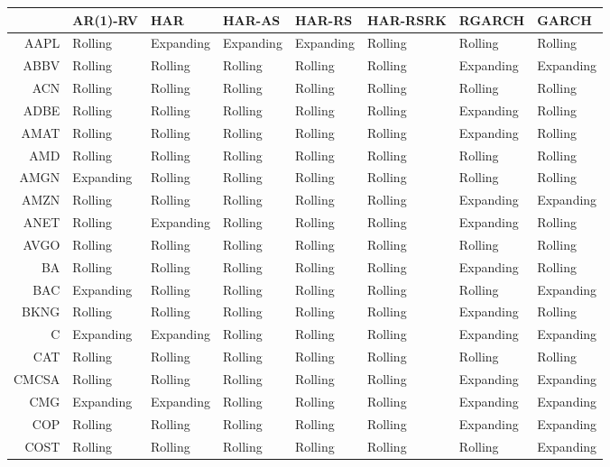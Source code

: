 \begin{table}[ht]
\centering
\begin{tabular}{rlllllll}
  \hline
 & AR(1)-RV & HAR & HAR-AS & HAR-RS & HAR-RSRK & RGARCH & GARCH \\ 
  \hline
AAPL & Rolling & Expanding & Expanding & Expanding & Rolling & Rolling & Rolling \\ 
  ABBV & Rolling & Rolling & Rolling & Rolling & Rolling & Expanding & Expanding \\ 
  ACN & Rolling & Rolling & Rolling & Rolling & Rolling & Rolling & Rolling \\ 
  ADBE & Rolling & Rolling & Rolling & Rolling & Rolling & Expanding & Rolling \\ 
  AMAT & Rolling & Rolling & Rolling & Rolling & Rolling & Expanding & Rolling \\ 
  AMD & Rolling & Rolling & Rolling & Rolling & Rolling & Rolling & Rolling \\ 
  AMGN & Expanding & Rolling & Rolling & Rolling & Rolling & Rolling & Rolling \\ 
  AMZN & Rolling & Rolling & Rolling & Rolling & Rolling & Expanding & Expanding \\ 
  ANET & Rolling & Expanding & Rolling & Rolling & Rolling & Expanding & Rolling \\ 
  AVGO & Rolling & Rolling & Rolling & Rolling & Rolling & Rolling & Rolling \\ 
  BA & Rolling & Rolling & Rolling & Rolling & Rolling & Expanding & Rolling \\ 
  BAC & Expanding & Rolling & Rolling & Rolling & Rolling & Rolling & Expanding \\ 
  BKNG & Rolling & Rolling & Rolling & Rolling & Rolling & Expanding & Rolling \\ 
  C & Expanding & Expanding & Rolling & Rolling & Rolling & Expanding & Expanding \\ 
  CAT & Rolling & Rolling & Rolling & Rolling & Rolling & Rolling & Rolling \\ 
  CMCSA & Rolling & Rolling & Rolling & Rolling & Rolling & Expanding & Expanding \\ 
  CMG & Expanding & Expanding & Rolling & Rolling & Rolling & Expanding & Expanding \\ 
  COP & Rolling & Rolling & Rolling & Rolling & Rolling & Expanding & Expanding \\ 
  COST & Rolling & Rolling & Rolling & Rolling & Rolling & Rolling & Expanding \\ 

\end{tabular}
\end{table}
